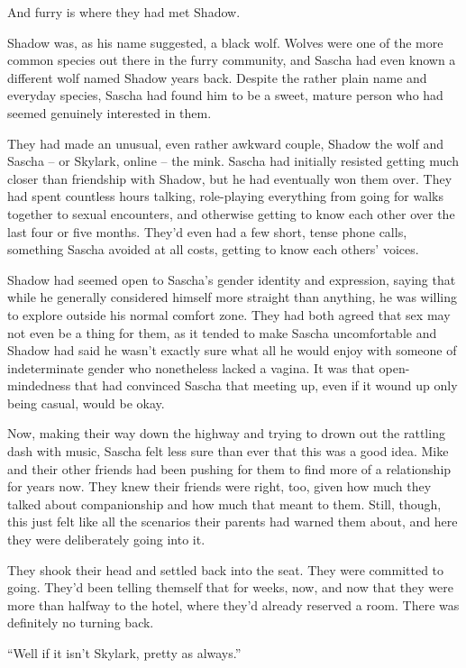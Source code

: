 And furry is where they had met Shadow.

Shadow was, as his name suggested, a black wolf. Wolves were one of the more common species out there in the furry community, and Sascha had even known a different wolf named Shadow years back. Despite the rather plain name and everyday species, Sascha had found him to be a sweet, mature person who had seemed genuinely interested in them.

They had made an unusual, even rather awkward couple, Shadow the wolf and Sascha -- or Skylark, online -- the mink. Sascha had initially resisted getting much closer than friendship with Shadow, but he had eventually won them over. They had spent countless hours talking, role-playing everything from going for walks together to sexual encounters, and otherwise getting to know each other over the last four or five months. They'd even had a few short, tense phone calls, something Sascha avoided at all costs, getting to know each others' voices.

Shadow had seemed open to Sascha's gender identity and expression, saying that while he generally considered himself more straight than anything, he was willing to explore outside his normal comfort zone. They had both agreed that sex may not even be a thing for them, as it tended to make Sascha uncomfortable and Shadow had said he wasn't exactly sure what all he would enjoy with someone of indeterminate gender who nonetheless lacked a vagina. It was that open-mindedness that had convinced Sascha that meeting up, even if it wound up only being casual, would be okay.

Now, making their way down the highway and trying to drown out the rattling dash with music, Sascha felt less sure than ever that this was a good idea. Mike and their other friends had been pushing for them to find more of a relationship for years now. They knew their friends were right, too, given how much they talked about companionship and how much that meant to them. Still, though, this just felt like all the scenarios their parents had warned them about, and here they were deliberately going into it.

They shook their head and settled back into the seat. They were committed to going. They'd been telling themself that for weeks, now, and now that they were more than halfway to the hotel, where they'd already reserved a room.  There was definitely no turning back.

\secdiv

``Well if it isn't Skylark, pretty as always.''

